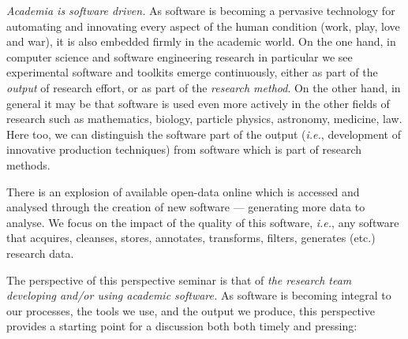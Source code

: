 \documentclass[a4paper,UKenglish]{dagman}
\newcommand{\ie}{\emph{i.e.},\xspace}
\begin{document}
\emph{Academia is software driven.} As software is becoming a pervasive technology for automating and innovating every aspect of the human condition (work, play, love and war), it is also embedded firmly in the academic world. On the one hand, in computer science and software engineering research in particular we see experimental software and toolkits emerge continuously, either as part of the \emph{output} of research effort, or as part of the \emph{research method}. On the other hand, in general it may be that software is used even more actively in the other fields of research such as mathematics, biology, particle physics, astronomy, medicine, law. Here too, we can distinguish the software part of the output (\ie development of innovative production techniques) from software which is part of research methods. 

There is an explosion of available open-data online which is accessed and analysed through the creation of new software --- generating more data to analyse. We focus on the impact of the quality of this software, \ie any software that acquires, cleanses, stores, annotates, transforms, filters, generates (etc.) research data.

The perspective of this perspective seminar is that of \emph{the research team developing and/or using academic software.} 
As software is becoming integral to our processes, the tools we use, and the output we produce, this perspective provides a starting point for a discussion both both timely and pressing:
\end{document}
